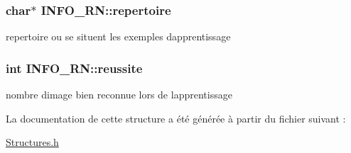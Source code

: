 \subsubsection[{\texorpdfstring{repertoire}{repertoire}}]{\setlength{\rightskip}{0pt plus 5cm}char$\ast$ I\+N\+F\+O\+\_\+\+R\+N\+::repertoire}\hypertarget{structINFO__RN_a18461fa670221134de73e534b777628c}{}\label{structINFO__RN_a18461fa670221134de73e534b777628c}
repertoire ou se situent les exemples d\textquotesingle{}apprentissage 
\subsubsection[{\texorpdfstring{reussite}{reussite}}]{\setlength{\rightskip}{0pt plus 5cm}int I\+N\+F\+O\+\_\+\+R\+N\+::reussite}\hypertarget{structINFO__RN_a3cab3947c958e59dfe3cee9bc27c2e04}{}\label{structINFO__RN_a3cab3947c958e59dfe3cee9bc27c2e04}
nombre d\textquotesingle{}image bien reconnue lors de l\textquotesingle{}apprentissage 

La documentation de cette structure a été générée à partir du fichier suivant \+:\begin{DoxyCompactItemize}
\item 
\hyperlink{Structures_8h}{Structures.\+h}\end{DoxyCompactItemize}
